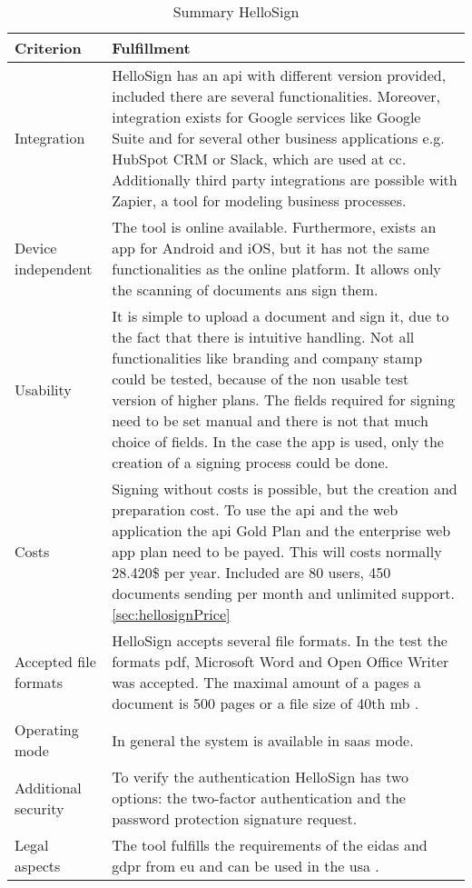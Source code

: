\begin{table}[h!]
	
	\begin{tabular}{|p{4cm}|p{10cm}|} \hline
		Criterion & Fulfillment \\ \hline
		Integration & HelloSign has an \gls{api} with different version provided, included there are several functionalities. Moreover, integration exists for Google services like Google Suite and for several other business applications e.g. HubSpot CRM or Slack, which are used at \gls{cc}. Additionally third party integrations are possible with Zapier, a tool for modeling business processes. \parencite{hellosign2018integration,hellosign2018api}\\ \hline
		Device independent & The tool is online available. Furthermore, exists an \gls{app} for Android and iOS, but it has not the same functionalities as the online platform. It allows only the scanning of documents ans sign them. \parencite{hellosign2018legal}\\ \hline
		Usability & It is simple to upload a document and sign it, due to the fact that there is intuitive handling. Not all functionalities like branding and company stamp could be tested, because of the non usable test version of higher plans. The fields required for signing need to be set manual and there is not that much choice of fields. In the case the \gls{app} is used, only the creation of a signing process could be done.\\ \hline
		Costs &  Signing without costs is possible, but the creation and preparation cost. To use the \gls{api} and the web application the \gls{api} Gold Plan and the enterprise web app plan need to be payed. This will costs normally 28.420\$ per year. Included are 80 users, 450 documents sending per month and unlimited support. \ref{sec:hellosignPrice} \\ \hline
		Accepted file formats & HelloSign accepts several file formats. In the test the formats \gls{pdf}, Microsoft Word and Open Office Writer was accepted. The maximal amount of a pages a document is 500 pages or a file size of 40th \gls{mb} \parencite{hellosign2018documents}.\\ \hline
		Operating mode & In general the system is available in \gls{saas} mode. \parencite{hellosign2018features} \\ \hline
		Additional security & To verify the authentication HelloSign has two options: the two-factor authentication and the password protection signature request.\parencite{hellosign2018security} \\ \hline
		Legal aspects & The tool fulfills the requirements of the \gls{eidas} and \gls{gdpr} from \gls{eu} and can be used in the \gls{usa} \parencite{hellosign2018legal,hellosign2018compliance}. \\ \hline
	\end{tabular}
	\caption{Summary HelloSign}
	\label{tab:hellosign}
\end{table}
\clearpage

